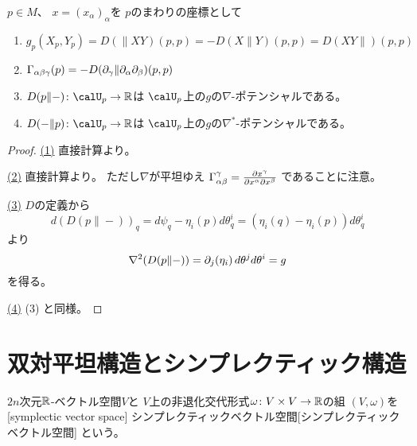 \documentclass[report]{jlreq}
\begin{document}
\begin{proposition}
    $p \in M$、
    $x = (x_\alpha)_\alpha$を
    $p$のまわりの座標として
    \begin{enumerate}
        \item $g_p(X_p, Y_p)
            = D(\| XY)(p, p)
            = -D(X \| Y)(p, p)
            = D(XY \|)(p, p)$
        \item $\Gamma_{\alpha \beta \gamma}(p)
            = - D(\partial_\gamma \| \partial_\alpha \partial_\beta)(p, p)$
        \item $D(p \| {-}) \colon \calU_p \to \R$は
            $\calU_p$上の$g$の$\nabla$-ポテンシャルである。
        \item $D({-} \| p) \colon \calU_p \to \R$は
            $\calU_p$上の$g$の$\nabla^*$-ポテンシャルである。
    \end{enumerate}
\end{proposition}

\begin{proof}
    \uline{(1)} \quad
    直接計算より。

    \uline{(2)} \quad
    直接計算より。
    ただし$\nabla$が平坦ゆえ
    $\Gamma_{\alpha \beta}^\gamma
        = \frac{\partial x^\gamma}{\partial x^\alpha \partial x^\beta}$
    であることに注意。

    \uline{(3)} \quad
    $D$の定義から
    \begin{equation}
        d(D(p \| {-}))_q
            = d\psi_q - \eta_i(p) d\theta^i_q
            = (\eta_i(q) - \eta_i(p)) d\theta^i_q
    \end{equation}
    より
    \begin{equation}
        \nabla^2 (D(p \| {-}))
            =
                \partial_j (\eta_i) \, d\theta^j d\theta^i
            =
                g
    \end{equation}
    を得る。

    \uline{(4)} \quad
    (3) と同様。
\end{proof}

%
\section{双対平坦構造とシンプレクティック構造}

\begin{definition}[シンプレクティックベクトル空間]
    $2n$次元$\mathbb{R}$-ベクトル空間$V$と
    $V$上の非退化交代形式$\omega \colon V \times V \to \mathbb{R}$の組
    $(V, \omega)$を
    [symplectic vector space]
        {シンプレクティックベクトル空間}[シンプレクティックベクトル空間]
    という。
\end{definition}
\end{document}
